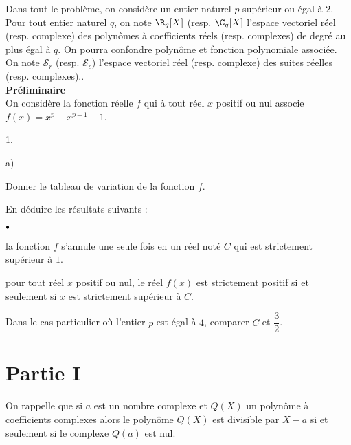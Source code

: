 \documentclass[11pt]{article}%
\begin{document}
\noindent Dans tout le problème, on considère un entier naturel $p$
supérieur ou égal à $2$. Pour tout entier naturel $q$, on note
$\R_{q}[X]
$ (resp. $\C_{q}[X]$ l'espace vectoriel réel (resp. complexe) des
polynômes à coefficients réels (resp. complexes) de degré au plus égal
à $q$. On pourra confondre polynôme et fonction polynomiale associée.\\
On note $\mathcal{S}_{r}$ (resp. $\mathcal{S}_{c}$) l'espace vectoriel
réel
(resp. complexe) des suites réelles (resp. complexes)..\\
\textbf{Préliminaire}\\
On considère la fonction réelle $f$ qui à tout réel $x$ positif ou nul
associe $f(x) = x^{p}-x^{p-1}-1$.

\begin{noliste}{1.}
 \setlength{\itemsep}{4mm}
\item 

\begin{noliste}{a)}
 \setlength{\itemsep}{2mm}
\item Donner le tableau de variation de la fonction $f$.

\item En déduire les résultats suivants :

\begin{noliste}{$\scriptstyle \bullet$}
\item la fonction $f$ s'annule une seule fois en un réel noté $C$ qui
est
strictement supérieur à $1$.

\item pour tout réel $x$ positif ou nul, le réel $f(x)$ est strictement
positif si et seulement si $x$ est strictement supérieur à $C$.
\end{noliste}
\end{noliste}

\item Dans le cas particulier où l'entier $p$ est égal à $4$, comparer
$C$
et ${\dfrac{3}{2}}$.
\end{noliste}

\section*{Partie I}

On rappelle que si $a$ est un nombre complexe et $Q(X)$ un polynôme à
coefficients complexes alors le polynôme $Q(X)$ est divisible par $X-a$
si
et seulement si le complexe $Q(a)$ est nul.
\end{document}
